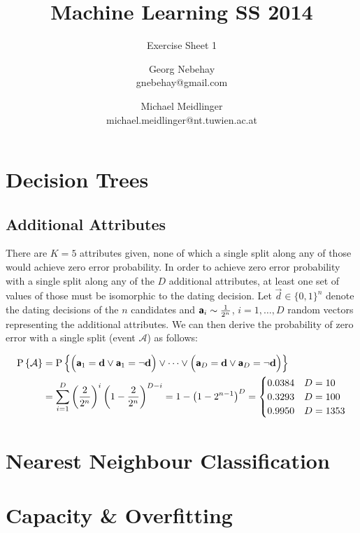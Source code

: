 \documentclass{scrartcl}
\title{Machine Learning SS 2014}
\subtitle{Exercise Sheet 1}
\author{Georg Nebehay\\gnebehay@gmail.com
\and
Michael Meidlinger\\
michael.meidlinger@nt.tuwien.ac.at
}
\date{}
\begin{document}
\maketitle

\section{Decision Trees}



\subsection{Additional Attributes}
There are $K=5$ attributes given, none of which a single split along any of those would achieve zero error probability. In order to achieve zero error probability with a single split along any of the $D$ additional attributes, at least one set of values of those must be isomorphic to the dating decision. Let $\vec d \in \lbrace 0,1\rbrace^n$ denote the dating decisions of the $n$ candidates and ${\textbf{\textsf{a}}}_i \sim \frac{1}{2^n}$, $i=1,\dots,D$  random vectors representing the additional attributes. We can then derive the probability of zero error with a single split (event $\mathcal A$) as follows:

\begin{align}
	\Prob{\mathcal A}& = 
	\Prob{ \Big(\rvec a_1 = \vec d \vee \rvec a_1 = \neg \vec d \Big) \vee 
		\dots \vee \Big(\rvec a_D = \vec d \vee \rvec a_D = \neg \vec d \Big)} \\
	&= \sum_{i=1}^{D}  \left( \frac{2}{2^n} \right)^i  \left( 1-\frac{2}{2^n}\right)^{D-i} 
	= 1- \left( 1-2^{n-1} \right)^{D} 
	= \begin{cases} 0.0384 &D=10 \\  0.3293 &D=100 \\ 0.9950 &D=1353\end{cases}
\end{align}

\section{Nearest Neighbour Classification}\label{prob2}
\section{Capacity \& Overfitting}
\end{document}
